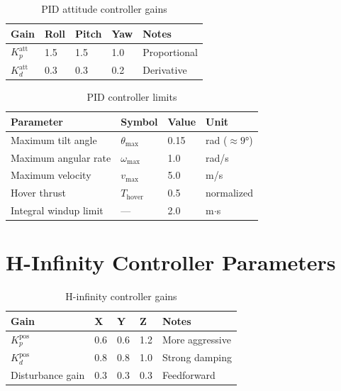 \begin{table}[htbp]
    \centering
    \caption{PID attitude controller gains}
    \label{tab:pid_att_gains}
    \begin{tabular}{@{}lllll@{}}
        \toprule
        \textbf{Gain} & \textbf{Roll} & \textbf{Pitch} & \textbf{Yaw} & \textbf{Notes} \\
        \midrule
        $K_p^{\text{att}}$ & 1.5 & 1.5 & 1.0 & Proportional \\
        $K_d^{\text{att}}$ & 0.3 & 0.3 & 0.2 & Derivative \\
        \bottomrule
    \end{tabular}
\end{table}

\begin{table}[htbp]
    \centering
    \caption{PID controller limits}
    \label{tab:pid_limits}
    \begin{tabular}{@{}llll@{}}
        \toprule
        \textbf{Parameter} & \textbf{Symbol} & \textbf{Value} & \textbf{Unit} \\
        \midrule
        Maximum tilt angle & $\theta_{\max}$ & 0.15 & rad ($\approx 9°$) \\
        Maximum angular rate & $\omega_{\max}$ & 1.0 & rad/s \\
        Maximum velocity & $v_{\max}$ & 5.0 & m/s \\
        Hover thrust & $T_{\text{hover}}$ & 0.5 & normalized \\
        Integral windup limit & --- & 2.0 & m$\cdot$s \\
        \bottomrule
    \end{tabular}
\end{table}

\section{H-Infinity Controller Parameters}

\begin{table}[htbp]
    \centering
    \caption{H-infinity controller gains}
    \label{tab:hinf_gains}
    \begin{tabular}{@{}lllll@{}}
        \toprule
        \textbf{Gain} & \textbf{X} & \textbf{Y} & \textbf{Z} & \textbf{Notes} \\
        \midrule
        $K_p^{\text{pos}}$ & 0.6 & 0.6 & 1.2 & More aggressive \\
        $K_d^{\text{pos}}$ & 0.8 & 0.8 & 1.0 & Strong damping \\
        Disturbance gain & 0.3 & 0.3 & 0.3 & Feedforward \\
        \bottomrule
    \end{tabular}
\end{table}

